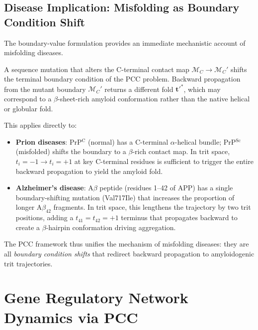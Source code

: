 \subsection{Disease Implication: Misfolding as Boundary Condition Shift}

The boundary-value formulation provides an immediate mechanistic account of
misfolding diseases.

\begin{proposition}[Misfolding = Boundary Mutation]
\label{prop:ch05-misfolding}
A sequence mutation that alters the C-terminal contact map
$\mathcal{M}_C \to \mathcal{M}_C'$ shifts the terminal boundary condition
of the PCC problem.  Backward propagation from the mutant boundary
$\mathcal{M}_C'$ returns a different fold $\mathbf{t}'^*$, which may
correspond to a $\beta$-sheet-rich amyloid conformation rather than the
native helical or globular fold.
\end{proposition}

This applies directly to:
\begin{itemize}
    \item \textbf{Prion diseases}: PrP$^\mathrm{C}$ (normal) has a C-terminal
          $\alpha$-helical bundle; PrP$^\mathrm{Sc}$ (misfolded) shifts the
          boundary to a $\beta$-rich contact map.  In trit space,
          $t_i = -1 \to t_i = +1$ at key C-terminal residues is sufficient
          to trigger the entire backward propagation to yield the amyloid fold.
    \item \textbf{Alzheimer's disease}: A$\beta$ peptide (residues 1--42
          of APP) has a single boundary-shifting mutation (Val717Ile) that
          increases the proportion of longer A$\beta_{42}$ fragments.  In
          trit space, this lengthens the trajectory by two trit positions,
          adding a $t_{41} = t_{42} = +1$ terminus that propagates backward
          to create a $\beta$-hairpin conformation driving aggregation.
\end{itemize}

The PCC framework thus unifies the mechanism of misfolding diseases: they
are all \emph{boundary condition shifts} that redirect backward propagation
to amyloidogenic trit trajectories.

\section{Gene Regulatory Network Dynamics via PCC}
\label{sec:ch05-grn}


